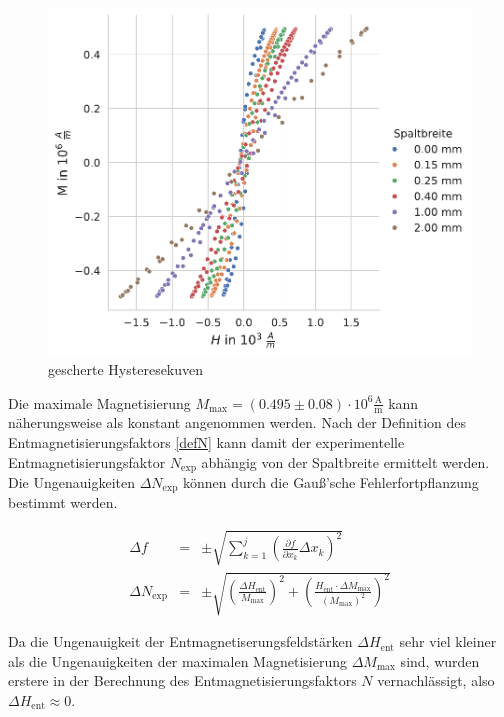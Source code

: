 \documentclass[12pt,a4paper]{scrartcl}
\numberwithin{equation}{section} %
\renewcommand{\[}{} %
\renewcommand{\]}{\noindent} %
\begin{document}
\begin{figure}
\centering
\includegraphics[scale=0.7]{../media/B2.4/3.3.3_overview.pdf}
\caption{gescherte Hysteresekuven}
\label{Abb: Scherung}
\end{figure}

Die maximale Magnetisierung \(M_\mathrm{max} = (0.495\pm 0.08) \cdot 10^6 \mathrm{\frac{A}{m}}\) kann näherungsweise als konstant angenommen werden. Nach der Definition des Entmagnetisierungsfaktors \eqref{defN} kann damit der experimentelle Entmagnetisierungsfaktor \(N_\mathrm{exp}\) abhängig von der Spaltbreite ermittelt werden. Die Ungenauigkeiten \(\Delta N_\mathrm{exp}\) können durch die Gauß'sche Fehlerfortpflanzung bestimmt werden.

\begin{eqnarray}
    \Delta f &=& \pm\sqrt{
        \sum_{k=1}^j
            \left(
                \frac{\partial f}{\partial x_k} \Delta x_k
            \right)^2
        } \\
    \Delta N_\mathrm{exp} &=&
        \pm\sqrt{
            \left(\frac{\Delta H_\mathrm{ent}}{M_\mathrm{max}}\right)^2
            + \left(\frac{H_\mathrm{ent}\cdot \Delta M_\mathrm{max}}{(M_\mathrm{max})^2}\right)^2       }
\end{eqnarray}

\noindent
Da die Ungenauigkeit der Entmagnetiserungsfeldstärken \(\Delta H_\mathrm{ent}\) sehr viel kleiner als die Ungenauigkeiten der maximalen Magnetisierung \(\Delta M_\mathrm{max}\) sind, wurden erstere in der Berechnung des Entmagnetisierungsfaktors \(N\) vernachlässigt, also \(\Delta H_\mathrm{ent}\approx 0\).
\end{document}

